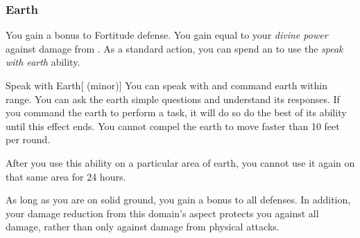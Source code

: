         \subsubsection{Earth}
             You gain a  bonus to Fortitude defense.
             You gain  equal to your \textit{divine power} against damage from .
             As a standard action, you can spend an  to use the \textit{speak with earth} ability.
            \begin{ability}{Speak with Earth}[ (minor)]
                You can speak with and command earth within \rnglong range.
                You can ask the earth simple questions and understand its responses.
                If you command the earth to perform a task, it will do so do the best of its ability until this effect ends.
                You cannot compel the earth to move faster than 10 feet per round.

                After you use this ability on a particular area of earth, you cannot use it again on that same area for 24 hours.
            \end{ability}
             As long as you are on solid ground, you gain a  bonus to all defenses.
            In addition, your damage reduction from this domain's aspect protects you against all damage, rather than only against damage from physical attacks.

